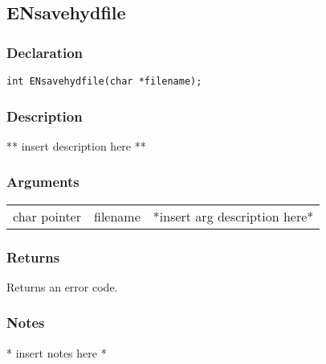 \subsection{ENsavehydfile}
\subsubsection{Declaration}
\begin{lstlisting}
int ENsavehydfile(char *filename);
\end{lstlisting}
\subsubsection{Description}
** insert description here **
\subsubsection{Arguments}
\begin{tabular}{l r p{11cm} }
char pointer&filename&*insert arg description here* \\[6pt]
\end{tabular}
\subsubsection{Returns}
Returns an error code.
\subsubsection{Notes}
* insert notes here *
